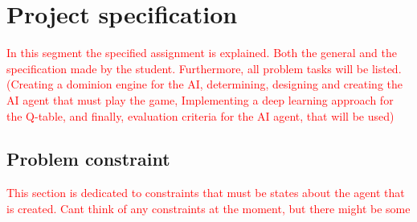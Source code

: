 \chapter{Project specification} \label{ch:intro}
\textcolor{red}{In this segment the specified assignment is explained. Both the general and the specification made by the student. Furthermore, all problem tasks will be listed. (Creating a dominion engine for the AI, determining, designing and creating the AI agent that must play the game, Implementing a deep learning approach for the Q-table, and finally, evaluation criteria for the AI agent, that will be used)}


\section{Problem constraint}
\textcolor{red}{This section is dedicated to constraints that must be states about the agent that is created. Cant think of any constraints at the moment, but there might be some}
